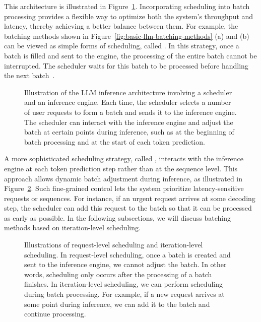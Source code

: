 This architecture is illustrated in Figure~\ref{fig:llm-inference-scheduler-and-engine}. Incorporating scheduling into batch processing provides a flexible way to optimize both the system's throughput and latency, thereby achieving a better balance between them. For example, the batching methods shown in Figure~\ref{fig:basic-llm-batching-methods} (a) and (b) can be viewed as simple forms of scheduling, called . In this strategy, once a batch is filled and sent to the engine, the processing of the entire batch cannot be interrupted. The scheduler waits for this batch to be processed before handling the next batch~\cite{timonin-etal:2022}.

\begin{figure}[!t]
\centering

\vspace{-0.5cm} \caption{Illustration of the LLM inference architecture involving a scheduler and an inference engine. Each time, the scheduler selects a number of user requests to form a batch and sends it to the inference engine. The scheduler can interact with the inference engine and adjust the batch at certain points during inference, such as at the beginning of batch processing and at the start of each token prediction.}
\label{fig:llm-inference-scheduler-and-engine}
\end{figure}

A more sophisticated scheduling strategy, called , interacts with the inference engine at each token prediction step rather than at the sequence level. This approach allows dynamic batch adjustment during inference, as illustrated in Figure~\ref{fig:llm-inference-and-iteration-level-scheduling}. Such fine-grained control lets the system prioritize latency-sensitive requests or sequences. For instance, if an urgent request arrives at some decoding step, the scheduler can add this request to the batch so that it can be processed as early as possible. In the following subsections, we will discuss batching methods based on iteration-level scheduling.

\begin{figure}[!t]
\centering

\vspace{-0.5cm} \caption{Illustrations of request-level scheduling and iteration-level scheduling. In request-level scheduling, once a batch is created and sent to the inference engine, we cannot adjust the batch. In other words, scheduling only occurs after the processing of a batch finishes. In iteration-level scheduling, we can perform scheduling during batch processing. For example, if a new request arrives at some point during inference, we can add it to the batch and continue processing.}
\label{fig:llm-inference-and-iteration-level-scheduling}
\end{figure}

